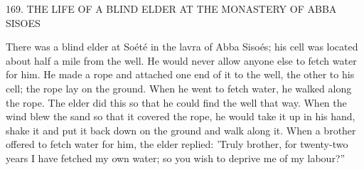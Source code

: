 169.
THE LIFE OF A BLIND ELDER AT THE
MONASTERY OF ABBA SISOES

There was a blind elder at Soété in the lavra of Abba Sisoés; his cell
was located about half a mile from the well.
He would never allow
anyone else to fetch water for him.
He made a rope and attached
one end of it to the well, the other to his cell; the rope lay on the
ground.
When he went to fetch water, he walked along the rope.
The elder did this so that he could find the well that way.
When the
wind blew the sand so that it covered the rope, he would take it up
in his hand, shake it and put it back down on the ground and walk
along it.
When a brother offered to fetch water for him, the elder
replied: 'Truly brother, for twenty-two years I have fetched my own
water; so you wish to deprive me of my labour?”

